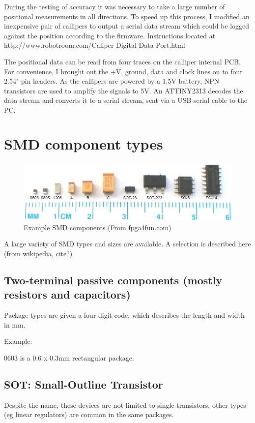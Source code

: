 \documentclass[a4paper,11pt]{article}  %
\begin{document}
During the testing of accuracy it was necessary to take a large number of positional measurements in all directions. 
To speed up this process, I modified an inexpensive pair of callipers to output a serial data stream which could be logged
against the position according to the firmware. Instructions located at http://www.robotroom.com/Caliper-Digital-Data-Port.html

The positional data can be read from four traces on the calliper internal PCB. For convenience, I brought out the +V, ground, data and clock lines
on to four 2.54" pin headers. As the callipers are powered by a 1.5V battery, NPN transistors are used to amplify the signals to 5V. An ATTINY2313
decodes the data stream and converts it to a serial stream, sent via a USB-serial cable to the PC.

\newpage
\section{SMD component types}

\begin{figure}[ht!]
\centering
\includegraphics[width=150mm]{resources/SMDsizes.jpg}
\caption{Example SMD components (From fpga4fun.com)}
\label{overflow}
\end{figure}

A large variety of SMD types and sizes are available. A selection is described here (from wikipedia, cite?)

\subsection{Two-terminal passive components (mostly resistors and capacitors)}
Package types are given a four digit code, which describes the length and width in mm.

Example:

0603 is a 0.6 x 0.3mm rectangular package.

\subsection{SOT: Small-Outline Transistor}
Despite the name, these devices are not limited to single transistors, other types (eg linear regulators) are
common in the same packages.
\end{document}

